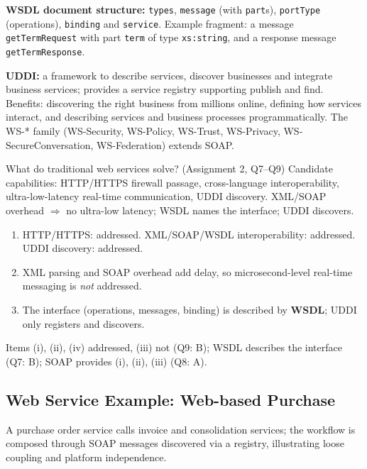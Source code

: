 \textbf{WSDL document structure:} \texttt{types}, \texttt{message} (with \texttt{part}s), \texttt{portType} (operations),
\texttt{binding} and \texttt{service}. Example fragment: a message \texttt{getTermRequest} with part \texttt{term} of
type \texttt{xs:string}, and a response message \texttt{getTermResponse}.

\textbf{UDDI:} a framework to describe services, discover businesses and integrate business services; provides a service
registry supporting publish and find. Benefits: discovering the right business from millions online, defining how services
interact, and describing services and business processes programmatically.
The WS-* family (WS-Security, WS-Policy, WS-Trust, WS-Privacy, WS-SecureConversation, WS-Federation) extends SOAP.

\begin{solved}{What do traditional web services solve? (Assignment 2, Q7--Q9)}
\Given Candidate capabilities: HTTP/HTTPS firewall passage, cross-language interoperability, ultra-low-latency
real-time communication, UDDI discovery.
\Formula XML/SOAP overhead $\Rightarrow$ no ultra-low latency; WSDL names the interface; UDDI discovers.
\Steps
\begin{enumerate}[leftmargin=*]
  \item HTTP/HTTPS: addressed. XML/SOAP/WSDL interoperability: addressed. UDDI discovery: addressed.
  \item XML parsing and SOAP overhead add delay, so microsecond-level real-time messaging is \emph{not} addressed.
  \item The interface (operations, messages, binding) is described by \textbf{WSDL}; UDDI only registers and discovers.
\end{enumerate}
\Answer Items (i), (ii), (iv) addressed, (iii) not (Q9: B); WSDL describes the interface (Q7: B); SOAP provides (i), (ii),
(iii) (Q8: A).
\end{solved}

\subsection{Web Service Example: Web-based Purchase}
A purchase order service calls invoice and consolidation services; the workflow is composed through SOAP messages
discovered via a registry, illustrating loose coupling and platform independence.

